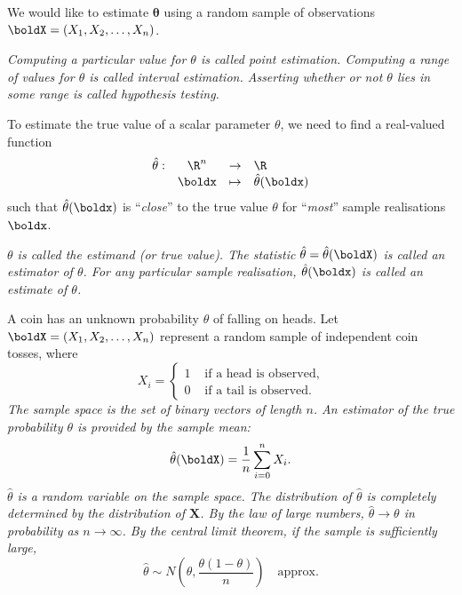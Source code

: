 We would like to estimate $\mathbf{\theta}$ using a random sample of observations $\boldX = (X_1,X_2,\ldots,X_n)$.

\begin{definition}
\bit
\it Computing a particular value for $\theta$ is called \emph{point estimation}.
\it Computing a range of values for $\theta$ is called \emph{interval estimation}.  
\it Asserting whether or not $\theta$ lies in some range is called \emph{hypothesis testing}.
\eit
\end{definition}


To estimate the true value of a scalar parameter $\theta$, we need to find a real-valued function 
\[\begin{array}{rccl}
\hat{\theta}:	& \R^n 		& \to 		& \R \\
				& \boldx	& \mapsto	& \hat{\theta}(\boldx)
\end{array}\]
such that $\hat{\theta}(\boldx)$ is ``\textsl{close}'' to the true value $\theta$ for ``\emph{most}'' sample realisations $\boldx$.

\begin{definition}
\bit
\it $\theta$ is called the \emph{estimand} (or \emph{true value}).
\it The statistic $\hat{\theta}=\hat{\theta}(\boldX)$ is called an \emph{estimator} of $\theta$.
\it For any particular sample realisation, $\hat{\theta}(\boldx)$ is called an \emph{estimate} of $\theta$.
\eit
\end{definition}



\begin{example}
A coin has an unknown probability $\theta$ of falling on heads. Let $\boldX = (X_1,X_2,\ldots,X_n)$ represent a random sample of independent coin tosses, where
\[
X_i = \begin{cases} 1 & \text{ if a head is observed,} \\ 0 & \text{ if a tail is observed.}\end{cases}
\]
\bit
\it The sample space is the set of binary vectors of length $n$.
\it An estimator of the true probability $\theta$ is provided by the sample mean:
\[
\hat{\theta}(\boldX) = \frac{1}{n}\sum_{i=0}^n X_i.
\]
\it $\hat{\theta}$ is a random variable on the sample space.
\it The distribution of $\hat{\theta}$ is completely determined by the distribution of $\mathbf{X}$.
\it By the law of large numbers, $\hat{\theta}\to\theta$ in probability as $n\to\infty$.
\it By the central limit theorem, if the sample is sufficiently large,
\[
\hat{\theta} \sim N\left(\theta,\frac{\theta(1-\theta)}{n}\right) \quad\text{approx.}
\]
\eit
\end{example}


\stopcontents[chapters]
\endinput
